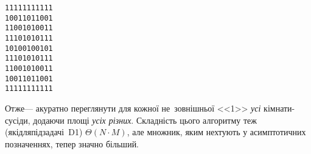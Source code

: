 {{{\begin{minipage}{5.5em}
\begin{small}
\begin{alltt}
11111111111\\
10011011001\\
11001010011\\
11101010111\\
10100100101\\
11101010111\\
11001010011\\
10011011001\\
11111111111\end{alltt}\end{small}\end{minipage}}}

\ifAfour
\myflfigaw{\castleTestIXcontent\castleTestXVIcontent}
\castleTestIXcomment
\par
\castleTestXVIcomment
\else
\par
\vspace{0.375\baselineskip}
\par
\mytextandpicture{\castleTestIXcomment}{\castleTestIXcontent}
\par
\vspace{0.375\baselineskip}
\par
\mytextandpicture{\castleTestXVIcomment}{\castleTestXVIcontent}
\fi

Отже\nolinebreak[3] --- акуратно переглянути для кожної не~зовнішньої <<1>> \emph{усі} кімнати-сусіди, додаючи площі \emph{усіх різних}.
Складність цього алгоритму теж (як\nolinebreak[3] і\nolinebreak[3] для\nolinebreak[2] під\-зада\-чі~D1) $\Theta(N{\cdot}M)$, але множник, яким нехтують у асимптотичних позначеннях, тепер значно більший.

}